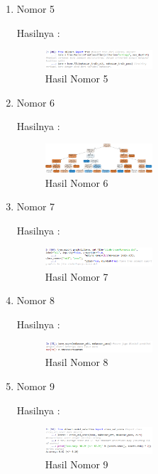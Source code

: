 \begin{enumerate}
\item Nomor 5
\hfill\break
	
Hasilnya :
\begin{figure}[H]
		\includegraphics[width=4cm]{figures/1174054/2/5.png}
		\centering
		\caption{Hasil Nomor 5}
\end{figure}

\item Nomor 6
\hfill\break
	
Hasilnya :
\begin{figure}[H]
		\includegraphics[width=4cm]{figures/1174054/2/6.png}
		\centering
		\caption{Hasil Nomor 6}
\end{figure}

\item Nomor 7
\hfill\break
	
Hasilnya :
\begin{figure}[H]
		\includegraphics[width=4cm]{figures/1174054/2/7.png}
		\centering
		\caption{Hasil Nomor 7}
\end{figure}

\item Nomor 8
\hfill\break
	
Hasilnya :
\begin{figure}[H]
		\includegraphics[width=4cm]{figures/1174054/2/8.png}
		\centering
		\caption{Hasil Nomor 8}
\end{figure}

\item Nomor 9
\hfill\break
	
Hasilnya :
\begin{figure}[H]
		\includegraphics[width=4cm]{figures/1174054/2/9.png}
		\centering
		\caption{Hasil Nomor 9}
\end{figure}


\end{enumerate}
